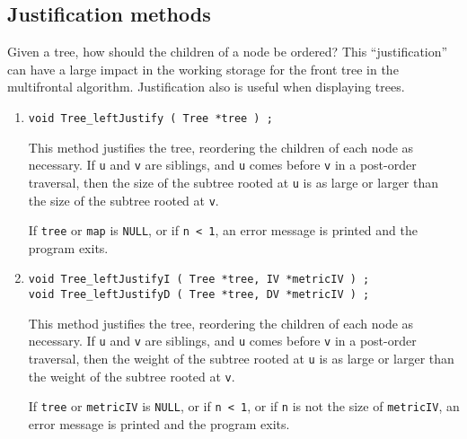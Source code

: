 \subsection{Justification methods}
\label{subsection:Tree:proto:justify}
\par
Given a tree, how should the children of a node be ordered?
This ``justification'' can have a large impact in the working
storage for the front tree in the multifrontal algorithm.
Justification also is useful when displaying trees.
\par
\begin{enumerate}
\item
\begin{verbatim}
void Tree_leftJustify ( Tree *tree ) ;
\end{verbatim}
This method justifies the tree, reordering the children of each
node as necessary.
If {\tt u} and {\tt v} are siblings, and {\tt u} comes
before {\tt v} in a post-order traversal, then the size of the
subtree rooted at {\tt u} is as large or larger than the size of
the subtree rooted at {\tt v}.
\par {}
If {\tt tree} or {\tt map} is {\tt NULL}, 
or if {\tt n < 1},
an error message is printed and the program exits.
\item
\begin{verbatim}
void Tree_leftJustifyI ( Tree *tree, IV *metricIV ) ;
void Tree_leftJustifyD ( Tree *tree, DV *metricIV ) ;
\end{verbatim}
This method justifies the tree, reordering the children of each
node as necessary.
If {\tt u} and {\tt v} are siblings, and {\tt u} comes
before {\tt v} in a post-order traversal, then the weight of the
subtree rooted at {\tt u} is as large or larger than the weight of
the subtree rooted at {\tt v}.
\par {}
If {\tt tree} or {\tt metricIV} is {\tt NULL}, 
or if {\tt n < 1},
or if {\tt n} is not the size of {\tt metricIV},
an error message is printed and the program exits.
\end{enumerate}
\par
